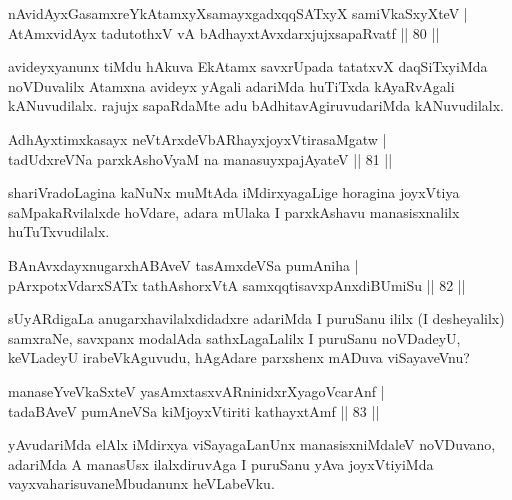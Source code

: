 
\begin{shl}
nAvidAyxGasamxreYkAtamxyXsamayxgadxqqSATxyX samiVkaSxyXteV | \\
AtAmxvidAyx tadutothxV vA bAdhayxtAvxdarxjujxsapaRvatf \hfill||  80 ||  
\end{shl}

\begin{artha}
avideyxyanunx tiMdu hAkuva EkAtamx savxrUpada tatatxvX daqSiTxyiMda noVDuvalilx Atamxna avideyx yAgali adariMda huTiTxda kAyaRvAgali kANuvudilalx. rajujx sapaRdaMte adu bAdhitavAgiruvudariMda kANuvudilalx.
\end{artha}


\begin{shl}
AdhAyxtimxkasayx neVtArxdeVbARhayxjoyxVtirasaMgatw | \\
tadUdxreVNa parxkAshoV\s yaM na manasuyxpajAyateV \hfill||  81 ||  
\end{shl}

\begin{artha}
shariVradoLagina kaNuNx muMtAda iMdirxyagaLige horagina  joyxVtiya saMpakaRvilalxde hoVdare, adara mUlaka I parxkAshavu manasisxnalilx huTuTxvudilalx.
\end{artha}

\begin{shl}
BAnAvxdayxnugarxhABAveV tasAmxdeVSa pumAniha | \\
pArxpotxV\s darxSATx tathA\s shorxVtA samxqqtisavxpAnxdiBUmiSu \hfill||  82 ||  
\end{shl}

\begin{artha}
sUyARdigaLa anugarxhavilalxdidadxre adariMda I puruSanu ililx (I desheyalilx) samxraNe, savxpanx modalAda sathxLagaLalilx I puruSanu noVDadeyU, keVLadeyU irabeVkAguvudu, hAgAdare parxshenx mADuva viSayaveVnu?
\end{artha}

\begin{shl}
manaseYveVkaSxteV yasAmxtasxvARninidxrXyagoVcarAnf |  \\
tada\footnotemark[1]{}BAveV pumAneVSa kiMjoyxVtiriti kathayxtAmf \hfill ||  83 ||  
\end{shl}

\begin{artha}
yAvudariMda elAlx iMdirxya viSayagaLanUnx manasisxniMdaleV noVDuvano, adariMda A manasUsx ilalxdiruvAga I puruSanu yAva joyxVtiyiMda vayxvaharisuvaneMbudanunx heVLabeVku.
\end{artha}

